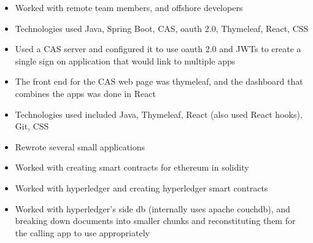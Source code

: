 \begin{cventries}
{\begin{cvitems}
{\begin{itemize}
                    \item {Worked with remote team members, and offshore developers}
                \end{itemize}
            }
            \item[] {
                \begin{itemize}
                    \item {Technologies used Java, Spring Boot, CAS, oauth 2.0, Thymeleaf, React, CSS}
                    \item {Used a CAS server and configured it to use oauth 2.0 and JWTs to create a single sign on application that would link to multiple apps}
                    \item {The front end for the CAS web page was thymeleaf, and the dashboard that combines the apps was done in React}
                \end{itemize}
            }
            \item[] {
                \begin{itemize}
                    \item {Technologies used included Java, Thymeleaf, React (also used React hooks), Git, CSS}
                    \item {Rewrote several small applications}
                \end{itemize}
            }
            \item[] {
                \begin{itemize}
                    \item {Worked with creating smart contracts for ethereum in solidity}
                    \item {Worked with hyperledger and creating hyperledger smart contracts}
                    \item {Worked with hyperledger's side db (internally uses apache couchdb),
                        and breaking down documents into smaller chunks and reconstituting them for the calling app to use appropriately}
                \end{itemize}
            }
        \end{cvitems}
    }


\end{cventries}
